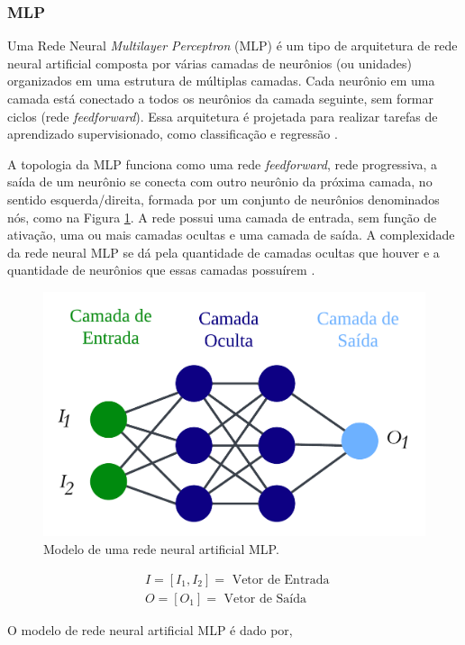 \subsubsection{MLP}
 
Uma Rede Neural \textit{Multilayer Perceptron} (MLP) é um tipo de arquitetura de rede neural artificial composta por várias camadas de neurônios (ou unidades) organizados em uma estrutura de múltiplas camadas. Cada neurônio em uma camada está conectado a todos os neurônios da camada seguinte, sem formar ciclos (rede \textit{feedforward}). Essa arquitetura é projetada para realizar tarefas de aprendizado supervisionado, como classificação e regressão \cite{QIN2023543}.

 A topologia da MLP funciona como uma rede \textit{feedforward}, rede progressiva, a saída de um neurônio se conecta com outro neurônio da próxima camada, no sentido esquerda/direita, formada por um conjunto de neurônios denominados nós, como  na Figura \ref{fig:ann}. A rede possui uma camada de entrada, sem função de ativação, uma ou mais camadas ocultas e uma camada de saída. A complexidade da rede neural MLP se dá pela quantidade de camadas ocultas que houver e a quantidade de neurônios que essas camadas possuírem \cite{Grubler2018}.
 
 \begin{figure}[!htb]
 	\centering
 	\caption{Modelo de uma rede neural artificial MLP.}
 	\includegraphics[width=0.5\linewidth]{Modelos/Figuras/ann.pdf}
 	
 	\label{fig:ann}
  \end{figure}
 
 \begin{equation}
 	\begin{aligned}
 		& I=\left[I_1, I_2\right]=\text { Vetor de Entrada } \\
 		& O=\left[O_1\right]=\text { Vetor de Saída }
 	\end{aligned} \nonumber
 \end{equation}
 
 O modelo de rede neural artificial MLP é dado por,
 
